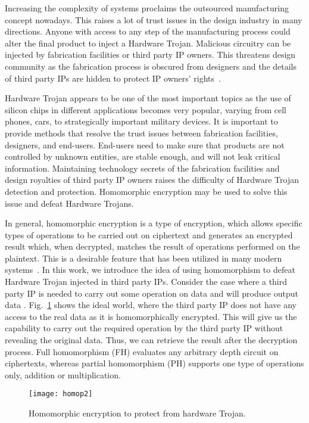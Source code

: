 \documentclass[conference]{IEEEtran}
\begin{document}
Increasing the complexity of systems proclaims the outsourced manufacturing concept nowadays. This raises a lot of trust issues in the design industry in many directions. Anyone with access to any step of the manufacturing process could alter the final product to inject a Hardware Trojan. Malicious circuitry can be injected by fabrication facilities or third party IP owners. This threatens design community as the fabrication process is obscured from designers and the details of third party IPs are hidden to protect IP owners' rights{\color{blue}~\cite{journal:Teh2010}}. 

Hardware Trojan appears to be one of the most important topics as the use of silicon chips in different applications becomes very popular, varying from cell phones, cars, to strategically important military devices. It is important to provide methods that resolve the trust issues between fabrication facilities, designers, and end-users. End-users need to make sure that products are not controlled by unknown entities, are stable enough, and will not leak critical information. Maintaining technology secrets of the fabrication facilities and design royalties of third party IP owners raises the difficulty of Hardware Trojan detection and protection. Homomorphic encryption may be used to solve this issue and defeat Hardware Trojans.

In general, homomorphic encryption is a type of encryption, which allows specific types of operations to be carried out on ciphertext and generates an encrypted result which, when decrypted, matches the result of operations performed on the plaintext. This is a desirable feature that has been utilized in many modern systems{\color{blue}~\cite{conf:Rout12, conf:Hrestak14}}. 
In this work, we introduce the idea of using homomorphism to defeat Hardware Trojan injected in third party IPs. Consider the case where a third party IP is needed to carry out some operation on data  and will produce output data . Fig.~\ref{fig:homop} shows the ideal world, where the third party IP does not have any access to the real data as it is homomorphically encrypted. This will give us the capability to carry out the required operation by the third party IP without revealing the original data. Thus, we can retrieve the result  after the decryption process. Full homomorphism (FH) evaluates any arbitrary depth circuit on ciphertexts, whereas partial homomorphism (PH) supports one type of operations only, addition or multiplication. 

\begin{figure}[htb]
\centering
\texttt{[image: homop2]}
\caption{Homomorphic encryption to protect from hardware Trojan.}
\label{fig:homop}
\end{figure}
\end{document}
